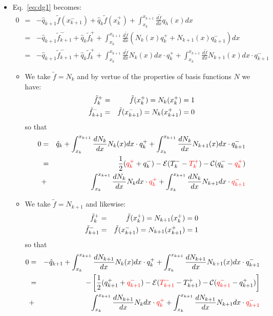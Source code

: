 \begin{itemize}
\item Eq.~\ref{eq:dg1} becomes:
\begin{eqnarray}
0 &=&
-\hat{q}_{k+1} \tilde{f}(x_{k+1}^-)
+\hat{q}_k     \tilde{f}(x_k^+)
+ \int_{x_k}^{x_{k+1}} \frac{d\tilde{f}}{dx} q_h(x) dx  \nonumber\\
&=&-\hat{q}_{k+1} \tilde{f}_{k+1}^-
+\hat{q}_k     \tilde{f}_k^+
+ \int_{x_k}^{x_{k+1}} \frac{d\tilde{f}}{dx} ( N_k(x) q_k^+ + N_{k+1}(x)q_{k+1}^- ) dx \nonumber\\
&=& -\hat{q}_{k+1} \tilde{f}_{k+1}^-
+\hat{q}_k     \tilde{f}_k^+
+ \int_{x_k}^{x_{k+1}} \frac{d\tilde{f}}{dx} N_k(x) dx \cdot q_k^+ 
+ \int_{x_k}^{x_{k+1}} \frac{d\tilde{f}}{dx} N_{k+1}(x) dx \cdot q_{k+1}^- 
\end{eqnarray}

\begin{itemize}
\item We take $\tilde{f}=N_k$ and by vertue of the properties of basis functions $N$ we have: 
\begin{eqnarray}
\tilde{f}_k^+&=&\tilde{f}(x_k^+) = N_k(x_k^+)=1 \nonumber\\
\tilde{f}_{k+1}^-&=&\tilde{f}(x_{k+1}^-)   = N_k(x_{k+1}^+)=0 \nonumber
\end{eqnarray}
so that 
\begin{eqnarray}
0 
&=& \hat{q}_k   
+ \int_{x_k}^{x_{k+1}} \frac{dN_k}{dx} N_k(x) dx \cdot q_k^+ 
+ \int_{x_k}^{x_{k+1}} \frac{dN_k}{dx} N_{k+1}(x) dx \cdot q_{k+1}^- \nonumber\\ 
&=& 
\frac{1}{2}({\color{red}q_k^+} + q_k^-) - {\cal E} (T_k^- - {\color{red}T_k^+}) 
- {\cal C}(q_k^- - {\color{red}q_k^+}) \nonumber\\
&+& \int_{x_k}^{x_{k+1}} \frac{dN_k}{dx} N_k dx \cdot {\color{red}q_k^+ }
+ \int_{x_k}^{x_{k+1}} \frac{dN_k}{dx} N_{k+1} dx \cdot {\color{red} q_{k+1}^-} \label{eq:dg4}
\end{eqnarray}

\item We take $\tilde{f}=N_{k+1}$ and likewise:
\begin{eqnarray}
\tilde{f}_k^+&=&\tilde{f}(x_k^+) = N_{k+1}(x_k^+)=0 \nonumber\\
\tilde{f}_{k+1}^-&=&\tilde{f}(x_{k+1}^-)   = N_{k+1}(x_{k+1}^+)=1 \nonumber
\end{eqnarray}
so that 
\begin{eqnarray}
0 
&=& -\hat{q}_{k+1} 
+ \int_{x_k}^{x_{k+1}} \frac{dN_{k+1}}{dx} N_k(x) dx \cdot q_k^+ 
+ \int_{x_k}^{x_{k+1}} \frac{dN_{k+1}}{dx} N_{k+1}(x) dx \cdot q_{k+1}^- \nonumber\\ 
&=& - \left[
\frac{1}{2}(q_{k+1}^+ + {\color{red}q_{k+1}^-}) - {\cal E} ({\color{red}T_{k+1}^-} 
- T_{k+1}^+) -{\cal C}({\color{red}q_{k+1}^-} - q_{k+1}^+) 
\right]\nonumber\\
&+& \int_{x_k}^{x_{k+1}} \frac{dN_{k+1}}{dx} N_k dx \cdot {\color{red}q_k^+} 
+ \int_{x_k}^{x_{k+1}} \frac{dN_{k+1}}{dx} N_{k+1}dx \cdot {\color{red}q_{k+1}^-}  \label{eq:dg6}
\end{eqnarray}




\end{itemize}
\end{itemize}
